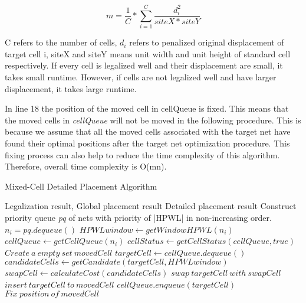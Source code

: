 \documentclass[sigconf,authordraft]{acmart}
\begin{document}
\begin{equation} 
    m = \frac{1}{C} * \sum_{i=1}^{C} \frac{d_{i}^{2}}{siteX*siteY}
\end{equation}

C refers to the number of cells, 
$d_{i}$ refers to penalized original displacement of target cell i, 
siteX and siteY means unit width and unit height of standard cell respectively. 
If every cell is legalized well and their displacement are small, it takes small runtime. 
However, if cells are not legalized well and have larger displacement, it takes large runtime.

In line 18 the position of the moved cell in cellQueue is fixed. This means that the moved cells in \textit{cellQueue} will not be moved in the following procedure. This is because we assume that all the moved cells associated with the target net have found their optimal positions after the target net optimization procedure. This fixing process can also help to reduce the time complexity of this algorithm.
Therefore, overall time complexity is O(mn).
\newcommand{\factorial}{\ensuremath{\mbox{\sc Factorial}}}
\begin{algorithm} 
\caption{Mixed-Cell Detailed Placement Algorithm}\label{euclid}
\algrenewcommand{}
\algrenewcommand{}
\begin{algorithmic}[1]
\Require Legalization result, Global placement result
\Ensure Detailed placement result
\State Construct priority queue \textit{pq} of nets with priority of |HPWL| in non-increasing order.  
\State $n_i = pq.dequeue()$
\State $HPWLwindow \gets getWindowHPWL(n_i)$
\State $cellQueue \gets getCellQueue(n_i)$
\State $cellStatus \gets getCellStatus(cellQueue, true)$
\State $Create\:a\:empty\:set\:movedCell$
      \State $targetCell\gets cellQueue.dequeue()$
      \State $candidateCells\gets getCandidate(targetCell, HPWLwindow)$
      \State $swapCell\gets calculateCost(candidateCells)$
      \State $swap\:targetCell\: with \:swapCell$
      \State $insert\: targetCell \:to \:movedCell$
      \EndIf
      \State $cellQueue.enqueue(targetCell)$
   \EndWhile\label{euclidendwhile}
\State $Fix\:position\:of\:movedCell$
\EndWhile\label{euclidendwhile}
\end{algorithmic}
\end{algorithm}
\end{document}
